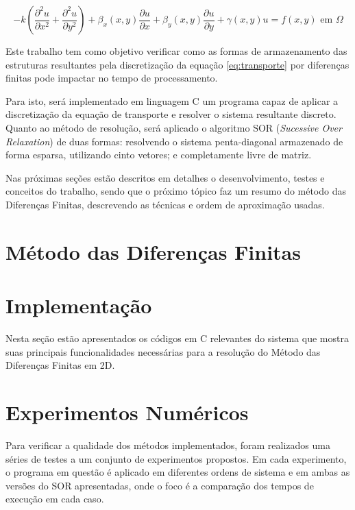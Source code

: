 \documentclass[
	11pt,				%
	oneside,			%
	a4paper,			%
	english,			%
	brazil,				%
	]{article}
\begin{document}
\begin{equation} \label{eq:transporte}
- k \left(\frac{\partial^2 u}{\partial x^2} + \frac{\partial^2 u}{\partial 
y^2}\right) +
\beta_x(x,y)\frac{\partial u}{\partial x} +
\beta_y(x,y)\frac{\partial u}{\partial y} +
\gamma(x,y)u = f(x,y) \text{ em } \Omega
\end{equation}

Este trabalho tem como objetivo verificar como as formas de
armazenamento das estruturas resultantes pela discretização
da equação \eqref{eq:transporte} por diferenças finitas pode
impactar no tempo de processamento.

Para isto, será implementado em linguagem C um programa capaz
de aplicar a discretização da equação de transporte e resolver
o sistema resultante discreto. Quanto ao método de resolução,
será aplicado o algoritmo SOR
(\textit{Sucessive Over Relaxation}) de duas formas:
resolvendo o sistema penta-diagonal armazenado de forma
esparsa, utilizando  cinto vetores; e completamente livre
de matriz.

Nas próximas seções estão descritos em detalhes o
desenvolvimento, testes e conceitos do trabalho, sendo que
o próximo tópico faz um resumo do método das Diferenças
Finitas, descrevendo as técnicas e ordem de aproximação
usadas.

\section{Método das Diferenças Finitas}
\lipsum[2]

\section{Implementação}
Nesta seção estão apresentados os códigos em C relevantes
do sistema que mostra suas principais funcionalidades
necessárias para a resolução do Método das Diferenças
Finitas em 2D.

\section{Experimentos Numéricos}
Para verificar a qualidade dos métodos implementados, foram
realizados uma séries de testes a um conjunto de
experimentos propostos. Em cada experimento, o programa em
questão é aplicado em diferentes ordens de sistema e em ambas
as versões do SOR apresentadas, onde o foco é a comparação dos
tempos de execução em cada caso.
\end{document}

